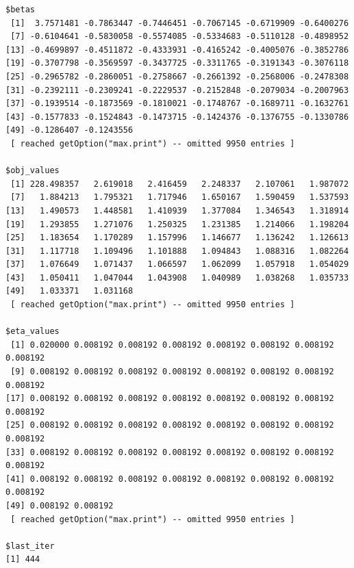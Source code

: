 \documentclass[
  letterpaper,
  DIV=11,
  numbers=noendperiod]{scrartcl}
\newenvironment{Shaded}{\begin{snugshade}}{\end{snugshade}}
\newcommand{\DecValTok}[1]{\textcolor[rgb]{0.68,0.00,0.00}{#1}}
\newcommand{\FunctionTok}[1]{\textcolor[rgb]{0.28,0.35,0.67}{#1}}
\newcommand{\NormalTok}[1]{\textcolor[rgb]{0.00,0.23,0.31}{#1}}
\newcommand{\SpecialCharTok}[1]{\textcolor[rgb]{0.37,0.37,0.37}{#1}}
\newcommand{\StringTok}[1]{\textcolor[rgb]{0.13,0.47,0.30}{#1}}
\begin{document}
\begin{verbatim}
$betas
 [1]  3.7571481 -0.7863447 -0.7446451 -0.7067145 -0.6719909 -0.6400276
 [7] -0.6104641 -0.5830058 -0.5574085 -0.5334683 -0.5110128 -0.4898952
[13] -0.4699897 -0.4511872 -0.4333931 -0.4165242 -0.4005076 -0.3852786
[19] -0.3707798 -0.3569597 -0.3437725 -0.3311765 -0.3191343 -0.3076118
[25] -0.2965782 -0.2860051 -0.2758667 -0.2661392 -0.2568006 -0.2478308
[31] -0.2392111 -0.2309241 -0.2229537 -0.2152848 -0.2079034 -0.2007963
[37] -0.1939514 -0.1873569 -0.1810021 -0.1748767 -0.1689711 -0.1632761
[43] -0.1577833 -0.1524843 -0.1473715 -0.1424376 -0.1376755 -0.1330786
[49] -0.1286407 -0.1243556
 [ reached getOption("max.print") -- omitted 9950 entries ]

$obj_values
 [1] 228.498357   2.619018   2.416459   2.248337   2.107061   1.987072
 [7]   1.884213   1.795321   1.717946   1.650167   1.590459   1.537593
[13]   1.490573   1.448581   1.410939   1.377084   1.346543   1.318914
[19]   1.293855   1.271076   1.250325   1.231385   1.214066   1.198204
[25]   1.183654   1.170289   1.157996   1.146677   1.136242   1.126613
[31]   1.117718   1.109496   1.101888   1.094843   1.088316   1.082264
[37]   1.076649   1.071437   1.066597   1.062099   1.057918   1.054029
[43]   1.050411   1.047044   1.043908   1.040989   1.038268   1.035733
[49]   1.033371   1.031168
 [ reached getOption("max.print") -- omitted 9950 entries ]

$eta_values
 [1] 0.020000 0.008192 0.008192 0.008192 0.008192 0.008192 0.008192 0.008192
 [9] 0.008192 0.008192 0.008192 0.008192 0.008192 0.008192 0.008192 0.008192
[17] 0.008192 0.008192 0.008192 0.008192 0.008192 0.008192 0.008192 0.008192
[25] 0.008192 0.008192 0.008192 0.008192 0.008192 0.008192 0.008192 0.008192
[33] 0.008192 0.008192 0.008192 0.008192 0.008192 0.008192 0.008192 0.008192
[41] 0.008192 0.008192 0.008192 0.008192 0.008192 0.008192 0.008192 0.008192
[49] 0.008192 0.008192
 [ reached getOption("max.print") -- omitted 9950 entries ]

$last_iter
[1] 444
\end{verbatim}

\begin{Shaded}
\end{Shaded}
\end{document}
